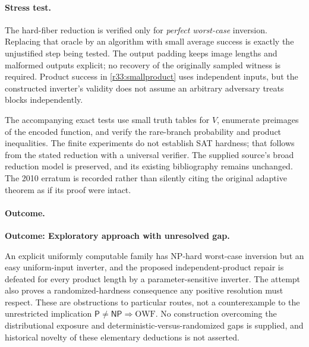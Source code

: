 \documentclass[11pt,a4paper]{article}
\numberwithin{equation}{section}
\begin{document}
\paragraph{Stress test.}
The hard-fiber reduction is verified only for \emph{perfect worst-case}
inversion. Replacing that oracle by an algorithm with small average success
is exactly the unjustified step being tested. The output padding keeps
image lengths and malformed outputs explicit; no recovery of the originally
sampled witness is required. Product success in \eqref{r33:smallproduct}
uses independent inputs, but the constructed inverter's validity does not
assume an arbitrary adversary treats blocks independently.

The accompanying exact tests use small truth tables for $V$, enumerate
preimages of the encoded function, and verify the rare-branch probability
and product inequalities. The finite experiments do not establish SAT
hardness; that follows from the stated reduction with a universal verifier.
The supplied source's broad reduction model is preserved, and its existing
bibliography remains unchanged. The 2010 erratum is recorded rather than
silently citing the original adaptive theorem as if its proof were intact.

\paragraph{Outcome.}
\textbf{Outcome: Exploratory approach with unresolved gap.}

An explicit uniformly computable family has NP-hard worst-case inversion
but an easy uniform-input inverter, and the proposed independent-product
repair is defeated for every product length by a parameter-sensitive
inverter. The attempt also proves a randomized-hardness consequence any
positive resolution must respect. These are obstructions to particular
routes, not a counterexample to the unrestricted implication
$\mathsf P\ne\mathsf{NP}\Rightarrow\mathrm{OWF}$. No construction overcoming
the distributional exposure and deterministic-versus-randomized gaps is
supplied, and historical novelty of these elementary deductions is not
asserted.

\end{document}
